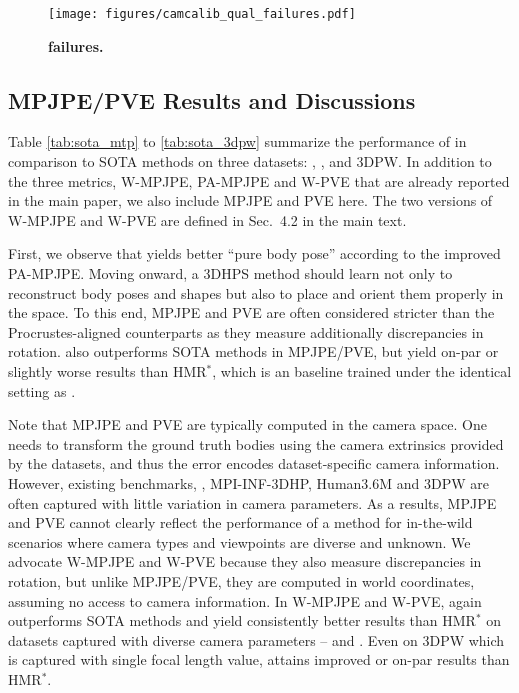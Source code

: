 \documentclass[10pt,twocolumn,letterpaper,usenames,dvipsnames]{article}
\begin{document}
\begin{figure*}
    \centering
    \texttt{[image: figures/camcalib\_qual\_failures.pdf]}
    \caption{\textbf{\camcalib failures.}}
    \label{fig:camcalib_qual_bad}
\end{figure*}

\subsection{\methodname MPJPE/PVE Results and Discussions}
Table \ref{tab:sota_mtp} to \ref{tab:sota_3dpw} summarize the performance of \methodname in comparison to SOTA methods on three datasets: \mtpcam, \agoracam, and 3DPW.
In addition to the three metrics, W-MPJPE, PA-MPJPE and W-PVE that are already reported in the main paper, we also include MPJPE and PVE here. 
The two versions of W-MPJPE and W-PVE are defined in Sec.~4.2 in the main text. 

First, we observe that \methodname yields better ``pure body pose'' according to the improved PA-MPJPE.
Moving onward, a 3DHPS method should learn not only to reconstruct body poses and shapes but also to place and orient them properly in the space.
To this end, MPJPE and PVE are often considered stricter than the Procrustes-aligned counterparts as they measure additionally discrepancies in rotation. 
\methodname also outperforms SOTA methods \cite{SPIN:ICCV:2019,kolotouros2019cmr,Moon_2020_ECCV_I2L-MeshNet,Rockwell2020} in MPJPE/PVE, but yield on-par or slightly worse results than HMR$^*$, which is an \iwcam baseline trained under the identical setting as \methodname.

Note that MPJPE and PVE are typically computed in the camera space. 
One needs to transform the ground truth bodies using the camera extrinsics provided by the datasets, and thus the error encodes dataset-specific camera information.
However, existing benchmarks, \eg, MPI-INF-3DHP, Human3.6M and 3DPW are often captured with little variation in camera parameters.
As a results, MPJPE and PVE cannot clearly reflect the performance of a \iwcam method for in-the-wild scenarios where camera types and viewpoints are diverse and unknown.
We advocate W-MPJPE and W-PVE because they also measure discrepancies in rotation, but unlike MPJPE/PVE, they are computed in world coordinates, assuming no access to camera information. 
In W-MPJPE and W-PVE, \methodname again outperforms SOTA methods \cite{SPIN:ICCV:2019,kolotouros2019cmr,Moon_2020_ECCV_I2L-MeshNet,Rockwell2020} and yield consistently better results than HMR$^*$ on datasets captured with diverse camera parameters -- \mtpcam and \agoracam. Even on 3DPW which is captured with single focal length value, \methodname attains improved or on-par results than HMR$^*$.
\end{document}

